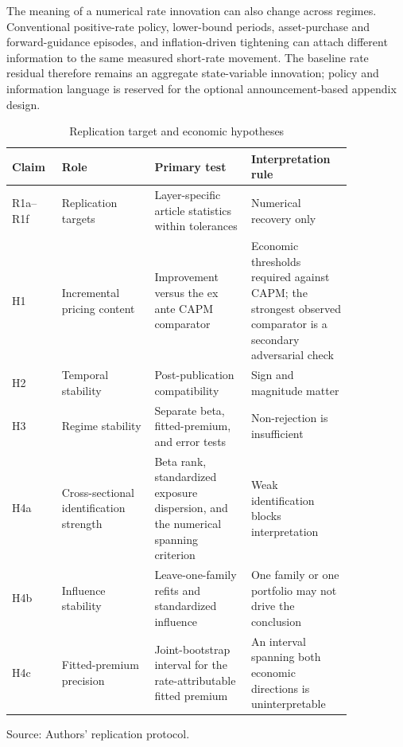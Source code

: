 \documentclass[11pt]{article}
\begin{document}
The meaning of a numerical rate innovation can also change across regimes.
Conventional positive-rate policy, lower-bound periods, asset-purchase and
forward-guidance episodes, and inflation-driven tightening can attach different
information to the same measured short-rate movement. The baseline rate residual
therefore remains an aggregate state-variable innovation; policy and information
language is reserved for the optional announcement-based appendix design.

\begin{table}[htbp]
\centering
\caption{Replication target and economic hypotheses}
\small
\begin{tabular}{p{0.12\linewidth}p{0.24\linewidth}p{0.25\linewidth}p{0.24\linewidth}}
\toprule
Claim & Role & Primary test & Interpretation rule \\
\midrule
R1a--R1f & Replication targets & Layer-specific article statistics within tolerances & Numerical recovery only \\
H1 & Incremental pricing content & Improvement versus the ex ante CAPM comparator & Economic thresholds required against CAPM; the strongest observed comparator is a secondary adversarial check \\ %
H2 & Temporal stability & Post-publication compatibility & Sign and magnitude matter \\
H3 & Regime stability & Separate beta, fitted-premium, and error tests & Non-rejection is insufficient \\
H4a & Cross-sectional identification strength & Beta rank, standardized exposure dispersion, and the numerical spanning criterion & Weak identification blocks interpretation \\ %
H4b & Influence stability & Leave-one-family refits and standardized influence & One family or one portfolio may not drive the conclusion \\ %
H4c & Fitted-premium precision & Joint-bootstrap interval for the rate-attributable fitted premium & An interval spanning both economic directions is uninterpretable \\ %
\bottomrule
\end{tabular}

\smallskip
\small Source: Authors' replication protocol.
\end{table}
\end{document}
